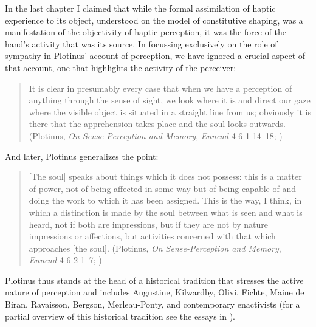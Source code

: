 In the last chapter I claimed that while the formal assimilation of haptic experience to its object, understood on the model of constitutive shaping, was a manifestation of the objectivity of haptic perception, it was the force of the hand's activity that was its source. In focussing exclusively on the role of sympathy in Plotinus' account of perception, we have ignored a crucial aspect of that account, one that highlights the activity of the perceiver:
\begin{quote}
	It is clear in presumably every case that when we have a perception of anything through the sense of sight, we look where it is and direct our gaze where the visible object is situated in a straight line from us; obviously it is there that the apprehension takes place and the soul looks outwards. (Plotinus, \emph{On Sense-Perception and Memory}, \emph{Ennead} 4 6 1 14--18; \citealt[321]{Armstrong:1984aa})
\end{quote}
And later, Plotinus generalizes the point:
\begin{quote}
	[The soul] speaks about things which it does not possess: this is a matter of power, not of being affected in some way but of being capable of and doing the work to which it has been assigned. This is the way, I think, in which a distinction is made by the soul between what is seen and what is heard, not if both are impressions, but if they are not by nature impressions or affections, but activities concerned with that which approaches [the soul]. (Plotinus, \emph{On Sense-Perception and Memory}, \emph{Ennead} 4 6 2 1--7; \citealt[325]{Armstrong:1984aa})
\end{quote}
Plotinus thus stands at the head of a historical tradition that stresses the active nature of perception and includes Augustine, Kilwardby, Olivi, Fichte, Maine de Biran, Ravaisson, Bergson, Merleau-Ponty, and contemporary enactivists (for a partial overview of this historical tradition see the essays in \citealt{Silva:2014cl}). 

